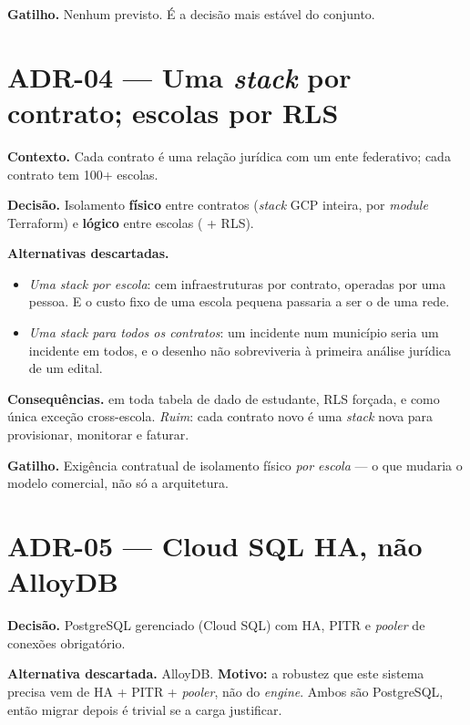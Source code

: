 \textbf{Gatilho.} Nenhum previsto. É a decisão mais estável do conjunto.

\section{ADR-04 --- Uma \emph{stack} por contrato; escolas por RLS}

\textbf{Contexto.} Cada contrato é uma relação jurídica com um ente federativo;
cada contrato tem 100+ escolas.

\textbf{Decisão.} Isolamento \textbf{físico} entre contratos (\emph{stack} GCP
inteira, por \emph{module} Terraform) e \textbf{lógico} entre escolas
( + RLS).

\textbf{Alternativas descartadas.}
\begin{itemize}
  \item \emph{Uma \emph{stack} por escola}: cem infraestruturas por contrato,
    operadas por uma pessoa. E o custo fixo de uma escola pequena passaria a ser o
    de uma rede.
  \item \emph{Uma \emph{stack} para todos os contratos}: um incidente num
    município seria um incidente em todos, e o desenho não sobreviveria à primeira
    análise jurídica de um edital.
\end{itemize}

\textbf{Consequências.}  em toda tabela de dado de estudante, RLS
forçada, e  como única exceção cross-escola. \emph{Ruim}: cada
contrato novo é uma \emph{stack} nova para provisionar, monitorar e faturar.

\textbf{Gatilho.} Exigência contratual de isolamento físico \emph{por escola} ---
o que mudaria o modelo comercial, não só a arquitetura.

\section{ADR-05 --- Cloud SQL HA, não AlloyDB}

\textbf{Decisão.} PostgreSQL gerenciado (Cloud SQL) com HA, PITR e \emph{pooler}
de conexões obrigatório.

\textbf{Alternativa descartada.} AlloyDB. \textbf{Motivo:} a robustez que este
sistema precisa vem de HA + PITR + \emph{pooler}, não do \emph{engine}. Ambos são
PostgreSQL, então migrar depois é trivial se a carga justificar.


